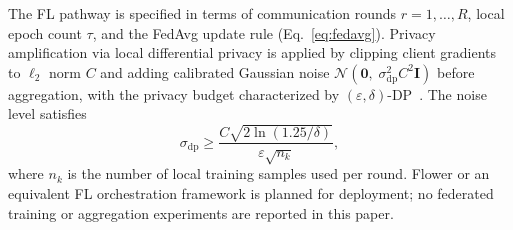 The FL pathway is specified in terms of communication rounds $r=1,\ldots,R$,
local epoch count $\tau$, and the FedAvg update rule (Eq.~\ref{eq:fedavg}).
Privacy amplification via local differential privacy is applied by clipping
client gradients to $\ell_2$ norm $C$ and adding calibrated Gaussian noise
$\mathcal{N}(\mathbf{0},\; \sigma_{\mathrm{dp}}^2 C^2 \mathbf{I})$
before aggregation, with the privacy budget characterized by
$(\varepsilon,\delta)$-DP~\cite{kairouz2021advances}.
The noise level satisfies
\begin{equation}
  \sigma_{\mathrm{dp}} \geq
  \frac{C\sqrt{2\ln(1.25/\delta)}}{\varepsilon \sqrt{n_k}},
  \label{eq:dp_noise}
\end{equation}
where $n_k$ is the number of local training samples used per round.
Flower or an equivalent FL orchestration framework is planned for
deployment; no federated training or aggregation experiments are reported
in this paper.
